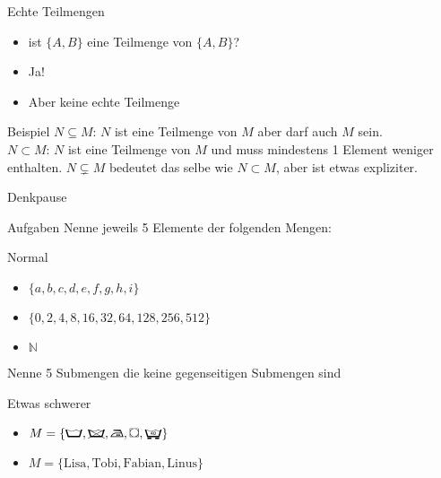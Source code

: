 \begin{frame}{Echte Teilmengen}
    \begin{itemize}
        \item ist $\{A,B\}$ eine Teilmenge von $\{A,B\}$?
              \pause
        \item \alert{Ja!}
              \pause
        \item Aber keine \alert{echte} Teilmenge
    \end{itemize}
    \pause
    \begin{exampleblock}{Beispiel}
        $N \subseteq M$: $N$ ist eine Teilmenge von $M$ aber darf auch $M$ sein.\\
        $N \subset M$: $N$ ist eine Teilmenge von $M$ und muss mindestens 1 Element weniger enthalten.
        $N \subsetneq M$ bedeutet das selbe wie $N \subset M$, aber ist etwas expliziter.
    \end{exampleblock}
\end{frame}

{
\begin{frame}[fragile]{Denkpause}
    \begin{alertblock}{Aufgaben}
        Nenne jeweils 5 Elemente der folgenden Mengen:
    \end{alertblock}

    \begin{block}{Normal}
        \begin{itemize}
            \item $\{a, b, c, d, e, f, g, h, i\}$
            \item $\{0, 2, 4, 8, 16, 32, 64, 128, 256, 512\}$
            \item $\mathbb N$
        \end{itemize}
    \end{block}
    Nenne 5 Submengen die keine gegenseitigen Submengen sind
    \begin{block}{Etwas schwerer}
        \begin{itemize}
            \item $M = \{\text{\WashCotton}, \text{\NoWash}, \text{\IroningII}, \text{\Tumbler}, \text{\SpecialForty} \}$
            \item $M = \{\text{Lisa}, \text{Tobi}, \text{Fabian}, \text{Linus}\}$
        \end{itemize}
    \end{block}
\end{frame}
}

